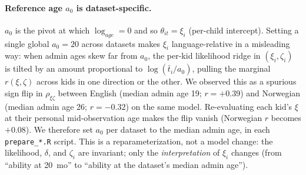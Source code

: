 \documentclass[11pt]{article}
\begin{document}
\paragraph{Reference age \(a_0\) is dataset-specific.}
\(a_0\) is the pivot at which \(\log_{age} = 0\) and so
\(\theta_{it} = \xi_i\) (per-child intercept). Setting a single
global \(a_0 = 20\) across datasets makes \(\xi_i\) language-relative
in a misleading way: when admin ages skew far from \(a_0\), the
per-kid likelihood ridge in \((\xi_i, \zeta_i)\) is tilted by an
amount proportional to \(\log(\bar t_i / a_0)\), pulling the marginal
\(r(\xi, \zeta)\) across kids in one direction or the other. We
observed this as a spurious sign flip in \(\rho_{\xi\zeta}\) between
English (median admin age 19; \(r = +0.39\)) and Norwegian (median
admin age 26; \(r = -0.32\)) on the same model. Re-evaluating each
kid's \(\xi\) at their personal mid-observation age makes the flip
vanish (Norwegian \(r\) becomes \(+0.08\)). We therefore set \(a_0\)
per dataset to the median admin age, in each \texttt{prepare\_*.R}
script. This is a reparameterization, not a model change: the
likelihood, \(\delta\), and \(\zeta_i\) are invariant; only the
\emph{interpretation} of \(\xi_i\) changes (from ``ability at 20~mo''
to ``ability at the dataset's median admin age'').
\end{document}

